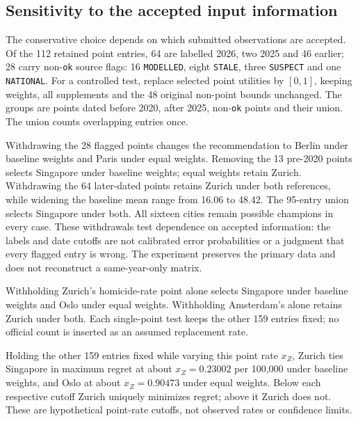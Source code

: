 \subsection{Sensitivity to the accepted input information}\label{sec:sourcepolicy}
The conservative choice depends on which submitted observations are accepted.
Of the 112 retained point entries, 64 are labelled 2026, two 2025 and 46 earlier;
28 carry non-\texttt{ok} source flags: 16 \texttt{MODELLED}, eight \texttt{STALE},
three \texttt{SUSPECT} and one \texttt{NATIONAL}.
For a controlled test, replace selected point utilities by $[0,1]$, keeping
weights, all supplements and the 48 original non-point bounds unchanged.
The groups are points dated before 2020, after 2025, non-\texttt{ok} points and
their union. The union counts overlapping entries once.



Withdrawing the 28 flagged points changes the recommendation to Berlin under
baseline weights and Paris under equal weights. Removing the 13 pre-2020 points
selects Singapore under baseline weights; equal weights retain Zurich.
Withdrawing the 64 later-dated points retains Zurich under both references,
while widening the baseline mean range from 16.06 to 48.42. The 95-entry union
selects Singapore under both. All sixteen cities remain possible champions
in every case. These withdrawals test dependence on accepted information:
the labels and date cutoffs are not calibrated error probabilities or a
judgment that every flagged entry is wrong. The experiment preserves the
primary data and does not reconstruct a same-year-only matrix.

Withholding Zurich's homicide-rate point alone selects Singapore under baseline
weights and Oslo under equal weights. Withholding Amsterdam's alone retains
Zurich under both. Each single-point test keeps the other 159 entries fixed;
no official count is inserted as an assumed replacement rate.

Holding the other 159 entries fixed while varying this point rate $x_Z$, Zurich ties Singapore in maximum regret at about $x_Z=0.23002$ per 100,000 under baseline weights, and Oslo at about $x_Z=0.90473$ under equal weights. Below each respective cutoff Zurich uniquely minimizes regret; above it Zurich does not. These are hypothetical point-rate cutoffs, not observed rates or confidence limits.
